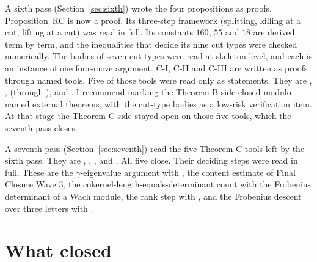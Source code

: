 \documentclass[11pt]{article}
\theoremstyle{definition}
\theoremstyle{remark}
\begin{document}
A sixth pass (Section~\ref{sec:sixth}) wrote the four propositions as proofs. Proposition~RC is now a proof. Its three-step framework (splitting, killing at a cut, lifting at a cut) was read in full. Its constants $160$, $55$ and $18$ are derived term by term, and the inequalities that decide its nine cut types were checked numerically. The bodies of seven cut types were read at skeleton level, and each is an instance of one four-move argument. C-I, C-II and C-III are written as proofs through named tools. Five of those tools were read only as statements. They are , ,  (through ),  and . I recommend marking the Theorem B side closed modulo named external theorems, with the cut-type bodies as a low-risk verification item. At that stage the Theorem C side stayed open on those five tools, which the seventh pass closes.

A seventh pass (Section~\ref{sec:seventh}) read the five Theorem C tools left by the sixth pass. They are , , ,  and . All five close. Their deciding steps were read in full. These are the $\gamma$-eigenvalue argument with , the content estimate of Final Closure Wave 3, the cokernel-length-equals-determinant count with the Frobenius determinant of a Wach module, the rank step with , and the Frobenius descent over three letters with .

\section{What closed}
\end{document}
